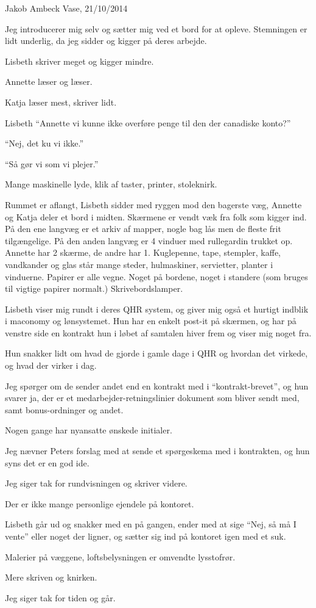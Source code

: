 Jakob Ambeck Vase, 21/10/2014

Jeg introducerer mig selv og sætter mig ved et bord for at opleve. Stemningen er lidt underlig, da jeg sidder og kigger på deres arbejde.

Lisbeth skriver meget og kigger mindre.

Annette læser og læser.

Katja læser mest, skriver lidt.

Lisbeth “Annette vi kunne ikke overføre penge til den der canadiske konto?”

“Nej, det ku vi ikke.”

“Så gør vi som vi plejer.”

Mange maskinelle lyde, klik af taster, printer, stoleknirk.

Rummet er aflangt, Lisbeth sidder med ryggen mod den bagerste væg, Annette og Katja deler et bord i midten. Skærmene er vendt væk fra folk som kigger ind. På den ene langvæg er et arkiv af mapper, nogle bag lås men de fleste frit tilgængelige. På den anden langvæg er 4 vinduer med rullegardin trukket op. Annette har 2 skærme, de andre har 1. Kuglepenne, tape, stempler, kaffe, vandkander og glas står mange steder, hulmaskiner, servietter, planter i vinduerne. Papirer er alle vegne. Noget på bordene, noget i standere (som bruges til vigtige papirer normalt.) Skrivebordslamper.

Lisbeth viser mig rundt i deres QHR system, og giver mig også et hurtigt indblik i maconomy og lønsystemet. Hun har en enkelt post-it på skærmen, og har på venstre side en kontrakt hun i løbet af samtalen hiver frem og viser mig noget fra.

Hun snakker lidt om hvad de gjorde i gamle dage i QHR og hvordan det virkede, og hvad der virker i dag.

Jeg spørger om de sender andet end en kontrakt med i “kontrakt-brevet”, og hun svarer ja, der er et medarbejder-retningslinier dokument som bliver sendt med, samt bonus-ordninger og andet.

Nogen gange har nyansatte ønskede initialer.

Jeg nævner Peters forslag med at sende et spørgeskema med i kontrakten, og hun syns det er en god ide.

Jeg siger tak for rundvisningen og skriver videre.

Der er ikke mange personlige ejendele på kontoret.

Lisbeth går ud og snakker med en på gangen, ender med at sige “Nej, så må I vente” eller noget der ligner, og sætter sig ind på kontoret igen med et suk.

Malerier på væggene, loftsbelysningen er omvendte lysstofrør.

Mere skriven og knirken.

Jeg siger tak for tiden og går.